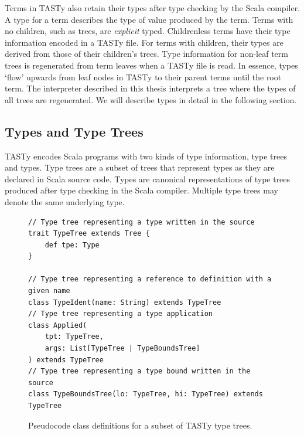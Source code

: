 Terms in TASTy also retain their types after type checking by the Scala compiler.
A type for a term describes the type of value produced by the term.
Terms with no children, such as  trees, are \textit{explicit} typed.
Childrenless terms have their type information encoded in a TASTy file.  
For terms with children, their types are derived from those of their children's trees.
Type information for non-leaf term trees is regenerated from term leaves when a TASTy file is read.
In essence, types `flow' upwards from leaf nodes in TASTy to their parent terms until the root term.
The interpreter described in this thesis interprets a tree where the types of all trees are regenerated.
We will describe types in detail in the following section.

\subsection{Types and Type Trees}

TASTy encodes Scala programs with two kinds of type information, type trees and types.
Type trees are a subset of trees that represent types as they are declared in Scala source code.
Types are canonical representations of type trees produced after type checking in the Scala compiler.
Multiple type trees may denote the same underlying type.

\begin{figure}[!htb]
\begin{verbatim}
// Type tree representing a type written in the source
trait TypeTree extends Tree {
	def tpe: Type
}

// Type tree representing a reference to definition with a given name
class TypeIdent(name: String) extends TypeTree
// Type tree representing a type application
class Applied(
	tpt: TypeTree, 
	args: List[TypeTree | TypeBoundsTree]
) extends TypeTree
// Type tree representing a type bound written in the source
class TypeBoundsTree(lo: TypeTree, hi: TypeTree) extends TypeTree
\end{verbatim} 
\caption{Pseudocode class definitions for a subset of TASTy type trees.}
\label{tasty:type-trees}
\end{figure}

